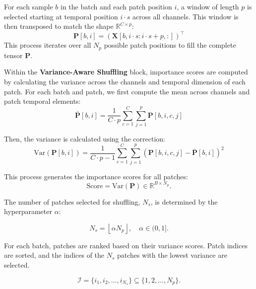 For each sample $b$ in the batch and each patch position $i$, a window of length $p$ is selected starting at temporal position $i \cdot s$ across all channels. This window is then transposed to match the shape $\mathbb{R}^{C \times p}$:
\begin{equation}
\mathbf{P}[b, i] = \left( \mathbf{X}[b, i \cdot s : i \cdot s + p, :] \right)^\top
\end{equation}
This process iterates over all $N_p$ possible patch positions to fill the complete tensor $\mathbf{P}$.


Within the \textbf{Variance-Aware Shuffling} block, importance scores are computed by calculating the variance across the channels and temporal dimension of each patch. For each batch and patch, we first compute the mean across channels and patch temporal elements:
\begin{equation}
\bar{\mathbf{P}}[b, i] = \frac{1}{C \cdot p} \sum_{c=1}^{C} \sum_{j=1}^{p} \mathbf{P}[b, i, c, j]
\end{equation}

Then, the variance is calculated using the correction:
\begin{equation}
\text{Var}(\mathbf{P}[b, i]) = \frac{1}{C \cdot p - 1} \sum_{c=1}^{C} \sum_{j=1}^{p} (\mathbf{P}[b, i, c, j] - \bar{\mathbf{P}}[b, i])^2
\end{equation}

This process generates the importance scores for all patches:
\begin{equation} \label{eq: score}
\text{Score} = \text{Var}(\mathbf{P}) \in \mathbb{R}^{B \times N_p}.
\end{equation}


The number of patches selected for shuffling, $N_s$, is determined by the hyperparameter $\alpha$:

\begin{equation} \label{eq:numberofpatches}
N_s = \left\lfloor \alpha N_p \right\rfloor, \quad \alpha \in (0, 1].
\end{equation}

For each batch, patches are ranked based on their variance scores. Patch indices are sorted, and the indices of the $N_s$ patches with the lowest variance are selected.



\begin{equation} \label{eq: patch_indices}
\mathcal{I} = \{ i_1, i_2, \dots, i_{N_s} \} \subseteq \{1, 2, \dots, N_p\}.
\end{equation}

